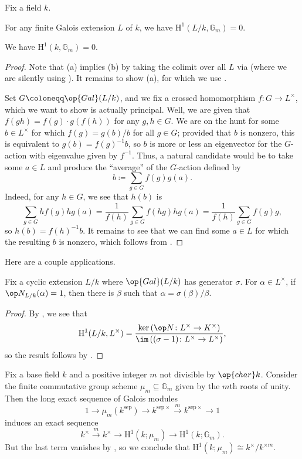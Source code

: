 \documentclass[notes.tex]{subfiles}
\begin{document}
\begin{theorem}[Hilbert 90] \label{thm:h90}
	Fix a field $k$.
	\begin{listalph}
		\item For any finite Galois extension $L$ of $k$, we have $\mathrm H^1(L/k,\mathbb G_m)=0$.
		\item We have $\mathrm H^1(k,\mathbb G_m)=0$.
	\end{listalph}
\end{theorem}
\begin{proof}
	Note that (a) implies (b) by taking the colimit over all $L$ via  (where we are silently using ). It remains to show (a), for which we use .
	
	Set $G\coloneqq\op{Gal}(L/k)$, and we fix a crossed homomorphism $f\colon G\to L^\times$, which we want to show is actually principal. Well, we are given that $f(gh)=f(g)\cdot g(f(h))$ for any $g,h\in G$. We are on the hunt for some $b\in L^\times$ for which $f(g)=g(b)/b$ for all $g\in G$; provided that $b$ is nonzero, this is equivalent to $g(b)=f(g)^{-1}b$, so $b$ is more or less an eigenvector for the $G$-action with eigenvalue given by $f^{-1}$. Thus, a natural candidate would be to take some $a\in L$ and produce the ``average'' of the $G$-action defined by
	\[b\coloneqq\sum_{g\in G}f(g)g(a).\]
	Indeed, for any $h\in G$, we see that $h(b)$ is
	\[\sum_{g\in G}hf(g)hg(a)=\frac1{f(h)}\sum_{g\in G}f(hg)hg(a)=\frac1{f(h)}\sum_{g\in G}f(g)g,\]
	so $h(b)=f\left(h\right)^{-1}b$. It remains to see that we can find some $a\in L$ for which the resulting $b$ is nonzero, which follows from .
\end{proof}
Here are a couple applications.
\begin{corollary}
	Fix a cyclic extension $L/k$ where $\op{Gal}(L/k)$ has generator $\sigma$. For $\alpha\in L^\times$, if $\op N_{L/k}(\alpha)=1$, then there is $\beta$ such that $\alpha=\sigma(\beta)/\beta$.
\end{corollary}
\begin{proof}
	By , we see that
	\[\mathrm H^1(L/k,L^\times)=\frac{\ker\left(\op N\colon L^\times\to K^\times\right)}{\im\left((\sigma-1)\colon L^\times\to L^\times\right)},\]
	so the result follows by .
\end{proof}
\begin{example} \label{ex:h1-of-mu-n}
	Fix a base field $k$ and a positive integer $m$ not divisible by $\op{char}k$. Consider the finite commutative group scheme $\mu_m\subseteq\mathbb G_m$ given by the $m$th roots of unity. Then the long exact sequence of Galois modules
	\[1\to\mu_m(k^{\mathrm{sep}})\to k^{\mathrm{sep}\times}\stackrel m\to k^{\mathrm{sep}\times}\to1\]
	induces an exact sequence
	\[k^\times\stackrel m\to k^\times\to\mathrm H^1(k;\mu_m)\to\mathrm H^1(k;\mathbb G_m).\]
	But the last term vanishes by , so we conclude that $\mathrm H^1(k;\mu_m)\cong k^\times/k^{\times m}$.
\end{example}
\end{document}
